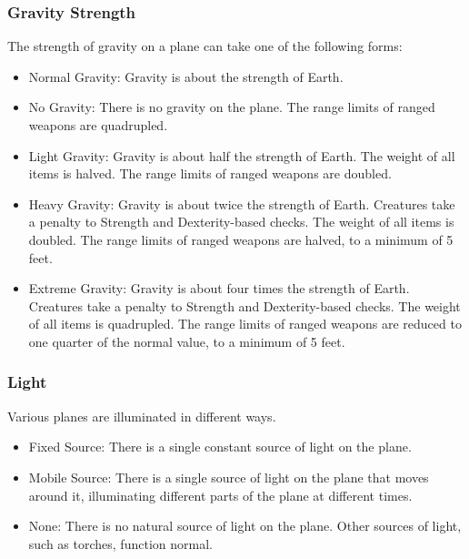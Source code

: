     \subsubsection{Gravity Strength} The strength of gravity on a plane can take one of the following forms:
      \begin{itemize}
        \item Normal Gravity: Gravity is about the strength of Earth.
        \item No Gravity: There is no gravity on the plane.
          The range limits of ranged weapons are quadrupled.
        \item Light Gravity: Gravity is about half the strength of Earth.
          The weight of all items is halved.
          The range limits of ranged weapons are doubled.
        \item Heavy Gravity: Gravity is about twice the strength of Earth.
          Creatures take a  penalty to Strength and Dexterity-based checks.
          The weight of all items is doubled.
          The range limits of ranged weapons are halved, to a minimum of 5 feet.
        \item Extreme Gravity: Gravity is about four times the strength of Earth.
          Creatures take a  penalty to Strength and Dexterity-based checks.
          The weight of all items is quadrupled.
          The range limits of ranged weapons are reduced to one quarter of the normal value, to a minimum of 5 feet.
      \end{itemize}

    \subsubsection{Light} Various planes are illuminated in different ways.
      \begin{itemize}
        \item Fixed Source: There is a single constant source of light on the plane.
        \item Mobile Source: There is a single source of light on the plane that moves around it, illuminating different parts of the plane at different times.
        \item None: There is no natural source of light on the plane.
          Other sources of light, such as torches, function normal.
      \end{itemize}

